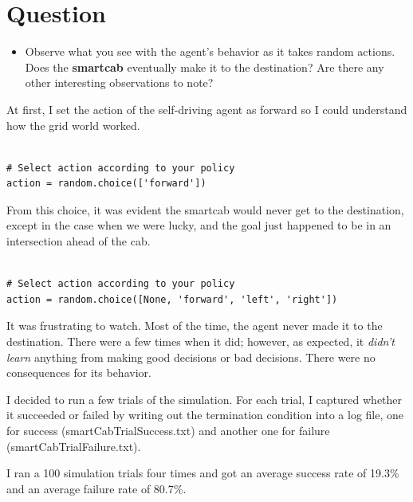 \documentclass[twoside,openright,titlepage,numbers=noenddot,headinclude,%
               footinclude=true,cleardoublepage=empty,abstractoff,BCOR=5mm,%
               paper=a4,fontsize=11pt,ngerman,american]{scrreprt}
\numberwithin{theorem}{chapter}
\numberwithin{definition}{chapter}
\numberwithin{algorithm}{chapter}
\numberwithin{figure}{chapter}
\numberwithin{table}{chapter}
\numberwithin{equation}{chapter}
\begin{document}
\section*{Question}

\begin{itemize}
\item Observe what you see with the agent's behavior as it takes random actions. Does the \textbf{smartcab} eventually make it to the destination? Are there any other interesting observations to note?
\end{itemize}

At first, I set the action of the self-driving agent as forward so I could understand how the grid world worked. 
\begin{verbatim}

# Select action according to your policy
action = random.choice(['forward'])

\end{verbatim}

From this choice, it was evident the smartcab would never get to the destination, except in the case when we were lucky, and the goal just happened to be in an intersection ahead of the cab.
\begin{verbatim}

# Select action according to your policy
action = random.choice([None, 'forward', 'left', 'right'])

\end{verbatim}

It was frustrating to watch. Most of the time, the agent never made it to the destination. There were a few times when it did; however, as expected, it \emph{didn't learn} anything from making good decisions or bad decisions. There were no consequences for its behavior.  

I decided to run a few trials of the simulation. For each trial, I captured whether it succeeded or failed by writing out the termination condition into a log file, one for success (smartCabTrialSuccess.txt) and another one for failure (smartCabTrialFailure.txt).

I ran a 100 simulation trials four times and got an average success rate of 19.3\% and an average failure rate of 80.7\%.




%
%
\end{document}
